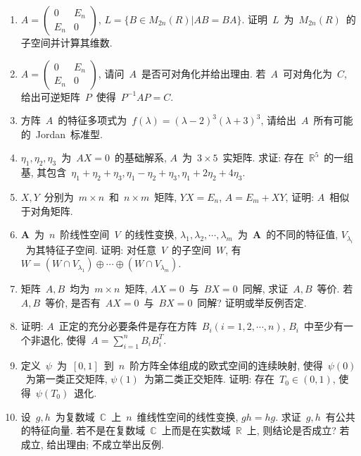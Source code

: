 \documentclass[UTF8,a4paper,11pt]{article}
\begin{document}
\begin{enumerate}
	\item $A=\begin{pmatrix}0 & E_n\\ E_n & 0\end{pmatrix}$, $L=\{B\in M_{2n}(R)|AB=BA\}$. 证明~$L$~为~$M_{2n}(R)$~的子空间并计算其维数.
	      \vspace{2em}
	\item $A=\begin{pmatrix}0 & E_n\\ E_n & 0\end{pmatrix}$, 请问~$A$~是否可对角化并给出理由. 若~$A$~可对角化为~$C$, 给出可逆矩阵~$P$~使得~$P^{-1}AP=C$.
	      \vspace{2em}
	\item 方阵~$A$~的特征多项式为~$f(\lambda)=(\lambda-2)^3(\lambda+3)^3$, 请给出~$A$~所有可能的~Jordan~标准型.
	      \vspace{2em}
	\item $\eta_1,\eta_2,\eta_3$~为~$AX=0$~的基础解系, $A$~为~$3\times 5$~实矩阵. 求证: 存在~$\mathbb{R}^5$~的一组基, 其包含~$\eta_1+\eta_2+\eta_3, \eta_1-\eta_2+\eta_3, \eta_1+2\eta_2+4\eta_3$.
	      \vspace{2em}
	\item $X,Y$~分别为~$m\times n$~和~$n\times m$~矩阵, $YX=E_n$, $A=E_m+XY$, 证明: $A$~相似于对角矩阵.
	      \vspace{2em}
	\item $\mathbf{A}$~为~$n$~阶线性空间~$V$~的线性变换, $\lambda_1,\lambda_2,\cdots,\lambda_m$~为~$\mathbf{A}$~的不同的特征值, $V_{\lambda_i}$~为其特征子空间. 证明: 对任意~$V$~的子空间~$W$, 有~$W=(W\cap V_{\lambda_1})\oplus\cdots\oplus(W\cap V_{\lambda_{m}})$.
	      \vspace{2em}
	\item 矩阵~$A,B$~均为~$m\times n$~矩阵, $AX=0$~与~$BX=0$~同解, 求证~$A,B$~等价. 若~$A,B$~等价, 是否有~$AX=0$~与~$BX=0$~同解? 证明或举反例否定.
	      \vspace{2em}
	\item 证明: $A$~正定的充分必要条件是存在方阵~$B_i(i=1,2,\cdots,n)$, $B_i$~中至少有一个非退化, 使得~$A=\sum_{i=1}^n B_iB_i^{T}$.
	      \vspace{2em}
	\item 定义~$\psi$~为~$[0,1]$~到~$n$~阶方阵全体组成的欧式空间的连续映射, 使得~$\psi(0)$~为第一类正交矩阵, $\psi(1)$~为第二类正交矩阵. 证明: 存在~$T_0\in(0,1)$, 使得~$\psi(T_0)$~退化.
	      \vspace{2em}
	\item 设~$g,h$~为复数域~$\mathbb{C}$~上~$n$~维线性空间的线性变换, $gh=hg$. 求证~$g,h$~有公共的特征向量. 若不是在复数域~$\mathbb{C}$~上而是在实数域~$\mathbb{R}$~上, 则结论是否成立? 若成立, 给出理由; 不成立举出反例.
	      \vspace{2em}
\end{enumerate}
\end{document}
